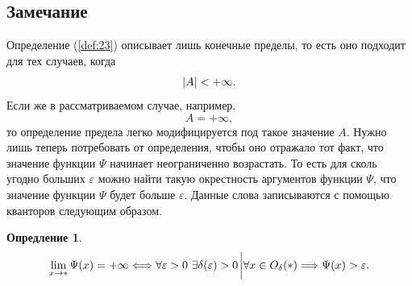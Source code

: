 \documentclass[12pt]{article}
\newtheorem{definition}{Опредление}[section]
\begin{document}
\subsection{Замечание}
Определение (\ref{def:23}) описывает лишь конечные пределы, то есть оно подходит для тех случаев, когда 
\begin{equation}
    \abs{A} < +\infty.
\end{equation}
Если же в рассматриваемом случае, например,
\begin{equation}
    A = +\infty,
\end{equation}
то определение предела легко модифицируется под такое значение $A$. Нужно лишь теперь потребовать от определения, чтобы оно отражало тот факт, что значение функции $\Psi$ начинает неограниченно возрастать. То есть для сколь угодно больших $\varepsilon$ можно найти такую окрестность аргументов функции $\Psi$, что значение функции $\Psi$ будет больше $\varepsilon$. Данные слова записываются с помощью кванторов следующим образом.
\begin{definition}\label{def:24}
\begin{equation}
    \lim_{x\rightarrow *}{\Psi \qty(x)} = +\infty \Longleftrightarrow \forall \varepsilon > 0\ \exists \delta\qty(\varepsilon) > 0 \eval \forall x \in O_\delta\qty(*) \Longrightarrow \Psi\qty(x) > \varepsilon.
\end{equation}
\end{definition}
\end{document}
